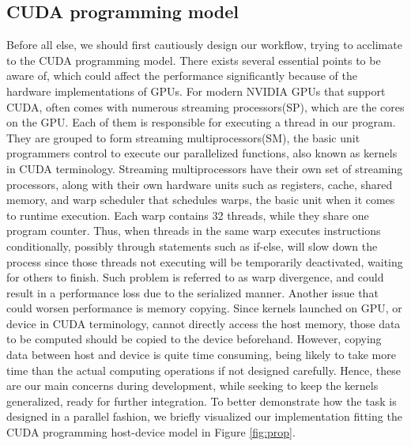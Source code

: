 \documentclass{PHlab-thesis}
\begin{document}
\subsection{CUDA programming model}
Before all else, we should first cautiously design our workflow, trying to acclimate to the CUDA programming model. There exists several essential points to be aware of, which could affect the performance significantly because of the hardware implementations of GPUs. For modern NVIDIA GPUs that support CUDA, often comes with numerous streaming processors(SP), which are the cores on the GPU. Each of them is responsible for executing a thread in our program. They are grouped to form streaming multiprocessors(SM), the basic unit programmers control to execute our parallelized functions, also known as kernels in CUDA terminology. Streaming multiprocessors have their own set of streaming processors, along with their own hardware units such as registers, cache, shared memory, and warp scheduler that schedules warps, the basic unit when it comes to runtime execution. Each warp contains 32 threads, while they share one program counter. Thus, when threads in the same warp executes instructions conditionally, possibly through statements such as if-else, will slow down the process since those threads not executing will be temporarily deactivated, waiting for others to finish. Such problem is referred to as warp divergence, and could result in a performance loss due to the serialized manner. Another issue that could worsen performance is memory copying. Since kernels launched on GPU, or device in CUDA terminology, cannot directly access the host memory, those data to be computed should be copied to the device beforehand. However, copying data between host and device is quite time consuming, being likely to take more time than the actual computing operations if not designed carefully. Hence, these are our main concerns during development, while seeking to keep the kernels generalized, ready for further integration. To better demonstrate how the task is designed in a parallel fashion, we briefly visualized our implementation fitting the CUDA programming host-device model in Figure \ref{fig:prop}. 
\end{document}
